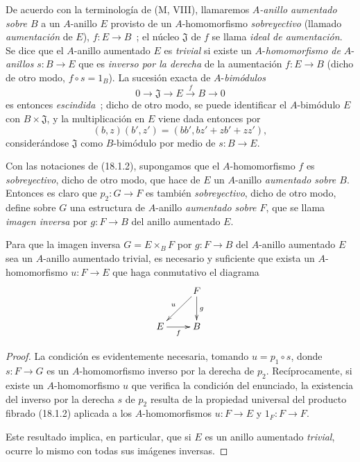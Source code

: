 \begin{env}[18.1.4]
\label{0.18.1.4-fr}
De acuerdo con la terminología de (M, VIII), llamaremos
\emph{$A$-anillo aumentado sobre $B$} a un $A$-anillo $E$ provisto de un
$A$-homomorfismo \emph{sobreyectivo} (llamado \emph{aumentación} de $E$),
$f:E\to B$~; el núcleo $\mathfrak{J}$ de $f$ se llama
\emph{ideal de aumentación}. Se dice que el $A$-anillo aumentado $E$ es
\emph{trivial} si existe un $A$-\emph{homomorfismo de} $A$-\emph{anillos} $s:B\to E$
que es \emph{inverso por la derecha} de la aumentación $f:E\to B$ (dicho de otro modo,
$f\circ s=1_B$). La sucesión exacta de $A$-\emph{bimódulos}
\[
  0\longrightarrow\mathfrak{J}\longrightarrow E
  \xrightarrow{f}B\longrightarrow0
\]
es entonces \emph{escindida}~; dicho de otro modo, se puede identificar el $A$-bimódulo
$E$ con $B\times\mathfrak{J}$, y la multiplicación en $E$ viene dada entonces
por
\[
  (b,z)(b',z')=(bb',bz'+zb'+zz'),
\]
considerándose $\mathfrak{J}$ como $B$-bimódulo por medio de $s:B\to E$.
\end{env}

\begin{env}[18.1.5]
\label{0.18.1.5-fr}
Con las notaciones de (18.1.2), supongamos que el $A$-homomorfismo $f$ es
\emph{sobreyectivo}, dicho de otro modo, que hace de $E$ un $A$-anillo \emph{aumentado sobre
$B$}. Entonces es claro que $p_2:G\to F$ es también \emph{sobreyectivo},
dicho de otro modo, define sobre $G$ una estructura de $A$-anillo \emph{aumentado sobre
$F$}, que se llama \emph{imagen inversa} por $g:F\to B$ del anillo
aumentado $E$.
\end{env}

\begin{proposition}[18.1.6]
\label{0.18.1.6-fr}
Para que la imagen inversa $G=E\times_BF$ por $g:F\to B$ del $A$-anillo
aumentado $E$ sea un $A$-anillo aumentado trivial, es necesario y suficiente que
exista un $A$-homomorfismo $u:F\to E$ que haga conmutativo el diagrama
\[
  \xymatrix{
    & F\ar[ld]_u\ar[d]^g\\
    E\ar[r]_f & B
  }
\]
\end{proposition}

\begin{proof}
La condición es evidentemente necesaria, tomando $u=p_1\circ s$, donde
$s:F\to G$ es un $A$-homomorfismo inverso por la derecha de $p_2$. Recíprocamente,
si existe un $A$-homomorfismo $u$ que verifica la condición del enunciado,
la existencia del inverso por la derecha $s$ de $p_2$ resulta de la propiedad
universal del producto fibrado (18.1.2) aplicada a los $A$-homomorfismos
$u:F\to E$ y $1_F:F\to F$.

Este resultado implica, en particular, que si $E$ es un anillo aumentado
\emph{trivial}, ocurre lo mismo con todas sus imágenes inversas.
\end{proof}

